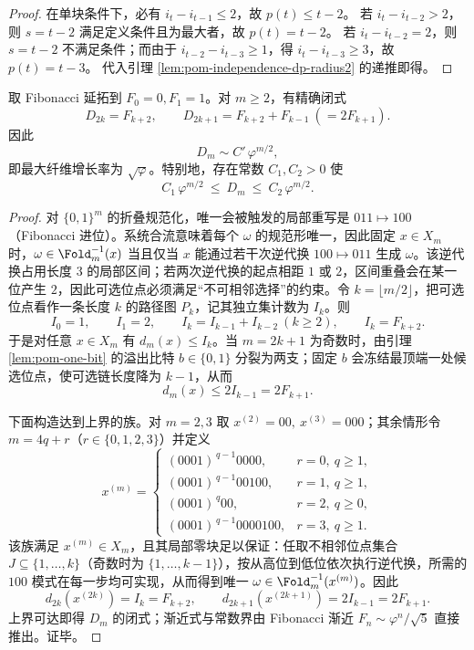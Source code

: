 \begin{proof}
在单块条件下，必有 $i_t-i_{t-1}\le 2$，故 $p(t)\le t-2$。
若 $i_t-i_{t-2}>2$，则 $s=t-2$ 满足定义条件且为最大者，故 $p(t)=t-2$。
若 $i_t-i_{t-2}=2$，则 $s=t-2$ 不满足条件；而由于 $i_{t-2}-i_{t-3}\ge 1$，得 $i_t-i_{t-3}\ge 3$，故 $p(t)=t-3$。
代入引理 \ref{lem:pom-independence-dp-radius2} 的递推即得。
\end{proof}
\begin{theorem}[最大纤维闭式]\label{thm:pom-max-fiber}
取 Fibonacci 延拓到 $F_0=0,F_1=1$。对 $m\ge 2$，有精确闭式
\[
D_{2k}=F_{k+2},
\qquad
D_{2k+1}=F_{k+2}+F_{k-1}\ (=2F_{k+1}).
\]
因此
\[
D_m\sim C'\,\varphi^{m/2},
\]
即最大纤维增长率为 $\sqrt{\varphi}$。特别地，存在常数 $C_1,C_2>0$ 使
\[
C_1\,\varphi^{m/2}\ \le\ D_m\ \le\ C_2\,\varphi^{m/2}.
\]
\end{theorem}
\begin{proof}
对 $\{0,1\}^m$ 的折叠规范化，唯一会被触发的局部重写是
\(
011\mapsto 100
\)
（Fibonacci 进位）。系统合流意味着每个 $\omega$ 的规范形唯一，因此固定 $x\in X_m$ 时，$\omega\in\Fold_m^{-1}(x)$ 当且仅当 $x$ 能通过若干次逆代换 $100\mapsto 011$ 生成 $\omega$。该逆代换占用长度 $3$ 的局部区间；若两次逆代换的起点相距 $1$ 或 $2$，区间重叠会在某一位产生 $2$，因此可选位点必须满足“不可相邻选择”的约束。令 $k=\lfloor m/2\rfloor$，把可选位点看作一条长度 $k$ 的路径图 $P_k$，记其独立集计数为 $I_k$。则
\[
I_0=1,\qquad I_1=2,\qquad I_k=I_{k-1}+I_{k-2}\ (k\ge 2),
\qquad I_k=F_{k+2}.
\]
于是对任意 $x\in X_m$ 有 $d_m(x)\le I_k$。当 $m=2k+1$ 为奇数时，由引理 \ref{lem:pom-one-bit} 的溢出比特 $b\in\{0,1\}$ 分裂为两支；固定 $b$ 会冻结最顶端一处候选位点，使可选链长度降为 $k-1$，从而
\[
d_m(x)\le 2I_{k-1}=2F_{k+1}.
\]

下面构造达到上界的族。对 $m=2,3$ 取
\(
x^{(2)}=00,\ x^{(3)}=000
\)；其余情形令 $m=4q+r$（$r\in\{0,1,2,3\}$）并定义
\[
x^{(m)}=
\begin{cases}
(0001)^{\,q-1}0000,& r=0,\ q\ge 1,\\[2pt]
(0001)^{\,q-1}00100,& r=1,\ q\ge 1,\\[2pt]
(0001)^{\,q}00,& r=2,\ q\ge 0,\\[2pt]
(0001)^{\,q-1}0000100,& r=3,\ q\ge 1.
\end{cases}
\]
该族满足 $x^{(m)}\in X_m$，且其局部零块足以保证：任取不相邻位点集合 $J\subseteq\{1,\dots,k\}$（奇数时为 $\{1,\dots,k-1\}$），按从高位到低位依次执行逆代换，所需的 $100$ 模式在每一步均可实现，从而得到唯一 $\omega\in\Fold_m^{-1}(x^{(m)})$。因此
\[
d_{2k}(x^{(2k)})=I_k=F_{k+2},
\qquad
d_{2k+1}(x^{(2k+1)})=2I_{k-1}=2F_{k+1}.
\]
上界可达即得 $D_m$ 的闭式；渐近式与常数界由 Fibonacci 渐近 $F_n\sim \varphi^n/\sqrt5$ 直接推出。证毕。
\end{proof}

